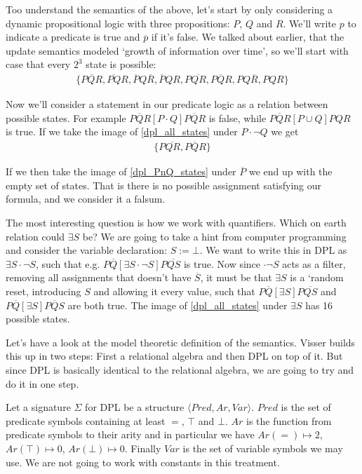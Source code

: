\documentclass[12pt]{article}
\begin{document}
Too understand the semantics of the above, let's start by only considering a dynamic propositional logic with three propositions: $P$, $Q$ and $R$. We'll write $p$ to indicate a predicate is true and $\overline{p}$ if it's false. We talked about earlier, that the update semantics modeled `growth of information over time', so we'll start with case that every $2^3$ state is possible:
%
\begin{align}
\{\overline{PQR}, \overline{PQ}R, \overline{P}Q\overline{R}, \overline{P}QR, P\overline{QR}, P\overline{Q}R, PQ\overline{R}, PQR\} \label{dpl_all_states}
\end{align}

Now we'll consider a statement in our predicate logic as a relation between possible states. For example $P\overline{Q}R[P\cdot Q]P\overline{Q}R$ is false, while $P\overline{Q}R[P\cup Q]PQR$ is true. If we take the image of \eqref{dpl_all_states} under $P\cdot\neg Q$ we get
%
\begin{align}
\{P\overline{QR}, P\overline{Q}R\} \label{dpl_PnQ_states}
\end{align}

If we then take the image of \eqref{dpl_PnQ_states} under $\overline{P}$ we end up with the empty set of states. That is there is no possible assignment satisfying our formula, and we consider it a falsum.

The most interesting question is how we work with quantifiers. Which on earth relation could $\exists S$ be? We are going to take a hint from computer programming and consider the variable declaration: $S:=\bot$. We want to write this in DPL as $\exists S \cdot \neg S$, such that e.g. $P\overline{Q}[\exists S \cdot \neg S]P\overline{QS}$ is true. Now since $\cdot\neg S$ acts as a filter, removing all assignments that doesn't have $\overline{S}$, it must be that $\exists S$ is a `random reset, introducing $S$ and allowing it every value, such that $P\overline{Q}[\exists S]P\overline{QS}$ and $P\overline{Q}[\exists S]P\overline{Q}S$ are both true. The image of \eqref{dpl_all_states} under $\exists S$ has 16 possible states.

Let's have a look at the model theoretic definition of the semantics. Visser builds this up in two steps: First a relational algebra and then DPL on top of it. But since DPL is basically identical to the relational algebra, we are going to try and do it in one step.

Let a signature $\Sigma$ for DPL be a structure $\langle Pred, Ar, Var\rangle$. $Pred$ is the set of predicate symbols containing at least $=$, $\top$ and $\bot$. $Ar$ is the function from predicate symbols to their arity and in particular we have $Ar(=) \mapsto 2$, $Ar(\top) \mapsto 0$, $Ar(\bot) \mapsto 0$. Finally $Var$ is the set of variable symbols we may use. We are not going to work with constants in this treatment.
\end{document}
